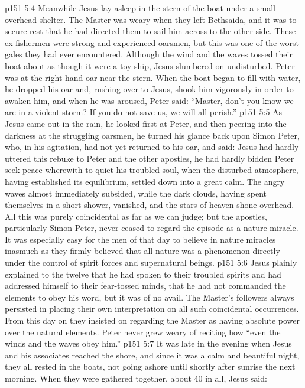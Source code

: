 \vs p151 5:4 Meanwhile Jesus lay asleep in the stern of the boat under a small overhead shelter. The Master was weary when they left Bethsaida, and it was to secure rest that he had directed them to sail him across to the other side. These ex\hyp{}fishermen were strong and experienced oarsmen, but this was one of the worst gales they had ever encountered. Although the wind and the waves tossed their boat about as though it were a toy ship, Jesus slumbered on undisturbed. Peter was at the right\hyp{}hand oar near the stern. When the boat began to fill with water, he dropped his oar and, rushing over to Jesus, shook him vigorously in order to awaken him, and when he was aroused, Peter said: “Master, don’t you know we are in a violent storm? If you do not save us, we will all perish.”
\vs p151 5:5 As Jesus came out in the rain, he looked first at Peter, and then peering into the darkness at the struggling oarsmen, he turned his glance back upon Simon Peter, who, in his agitation, had not yet returned to his oar, and said:  Jesus had hardly uttered this rebuke to Peter and the other apostles, he had hardly bidden Peter seek peace wherewith to quiet his troubled soul, when the disturbed atmosphere, having established its equilibrium, settled down into a great calm. The angry waves almost immediately subsided, while the dark clouds, having spent themselves in a short shower, vanished, and the stars of heaven shone overhead. All this was purely coincidental as far as we can judge; but the apostles, particularly Simon Peter, never ceased to regard the episode as a nature miracle. It was especially easy for the men of that day to believe in nature miracles inasmuch as they firmly believed that all nature was a phenomenon directly under the control of spirit forces and supernatural beings.
\vs p151 5:6 Jesus plainly explained to the twelve that he had spoken to their troubled spirits and had addressed himself to their fear\hyp{}tossed minds, that he had not commanded the elements to obey his word, but it was of no avail. The Master’s followers always persisted in placing their own interpretation on all such coincidental occurrences. From this day on they insisted on regarding the Master as having absolute power over the natural elements. Peter never grew weary of reciting how “even the winds and the waves obey him.”
\vs p151 5:7 It was late in the evening when Jesus and his associates reached the shore, and since it was a calm and beautiful night, they all rested in the boats, not going ashore until shortly after sunrise the next morning. When they were gathered together, about 40 in all, Jesus said: 
